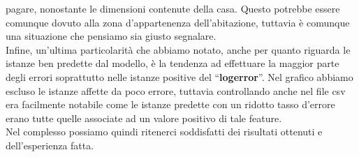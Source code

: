 pagare, nonostante le dimensioni contenute della casa. Questo potrebbe essere comunque dovuto alla zona d'appartenenza dell'abitazione, tuttavia è comunque una situazione che pensiamo sia giusto segnalare.\\
Infine, un'ultima particolarità che abbiamo notato, anche per quanto riguarda le istanze ben predette dal modello, è la tendenza ad effettuare la maggior parte degli errori soprattutto nelle istanze positive del ``\textbf{logerror}''. Nel grafico abbiamo escluso le istanze affette da poco errore, tuttavia controllando anche nel file csv era facilmente 
notabile come le istanze predette con un ridotto tasso d'errore erano tutte quelle associate ad un valore positivo di tale feature.\\
Nel complesso possiamo quindi ritenerci soddisfatti dei risultati ottenuti e dell'esperienza fatta.